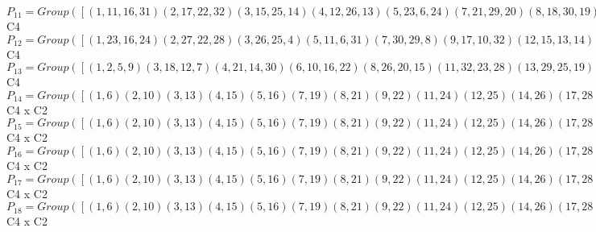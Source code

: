 \documentclass[varwidth=\maxdimen,border=10]{standalone}
\begin{document}
\begin{tabular}
$P_{11} = Group( [ ( 1,11,16,31)( 2,17,22,32)( 3,15,25,14)( 4,12,26,13)( 5,23, 6,24)( 7,21,29,20)( 8,18,30,19)( 9,27,10,28), ( 1,16)( 2,22)( 3,25)( 4,26)( 5, 6)( 7,29)( 8,30)( 9,10)(11,31)(12,13)(14,15)(17,32)(18,19)(20,21)(23,24)(27,28) ] )\cong$ C4\ \\
$P_{12} = Group( [ ( 1,23,16,24)( 2,27,22,28)( 3,26,25, 4)( 5,11, 6,31)( 7,30,29, 8)( 9,17,10,32)(12,15,13,14)(18,21,19,20), ( 1,16)( 2,22)( 3,25)( 4,26)( 5, 6)( 7,29)( 8,30)( 9,10)(11,31)(12,13)(14,15)(17,32)(18,19)(20,21)(23,24)(27,28) ] )\cong$ C4\ \\
$P_{13} = Group( [ ( 1, 2, 5, 9)( 3,18,12, 7)( 4,21,14,30)( 6,10,16,22)( 8,26,20,15)(11,32,23,28)(13,29,25,19)(17,24,27,31), ( 1, 5)( 2, 9)( 3,12)( 4,14)( 6,16)( 7,18)( 8,20)(10,22)(11,23)(13,25)(15,26)(17,27)(19,29)(21,30)(24,31)(28,32) ] )\cong$ C4\ \\
$P_{14} = Group( [ ( 1, 6)( 2,10)( 3,13)( 4,15)( 5,16)( 7,19)( 8,21)( 9,22)(11,24)(12,25)(14,26)(17,28)(18,29)(20,30)(23,31)(27,32), ( 1, 5)( 2, 9)( 3,12)( 4,14)( 6,16)( 7,18)( 8,20)(10,22)(11,23)(13,25)(15,26)(17,27)(19,29)(21,30)(24,31)(28,32), ( 1, 2, 5, 9)( 3,18,12, 7)( 4,21,14,30)( 6,10,16,22)( 8,26,20,15)(11,32,23,28)(13,29,25,19)(17,24,27,31) ] )\cong$ C4 x C2\ \\
$P_{15} = Group( [ ( 1, 6)( 2,10)( 3,13)( 4,15)( 5,16)( 7,19)( 8,21)( 9,22)(11,24)(12,25)(14,26)(17,28)(18,29)(20,30)(23,31)(27,32), ( 1, 5)( 2, 9)( 3,12)( 4,14)( 6,16)( 7,18)( 8,20)(10,22)(11,23)(13,25)(15,26)(17,27)(19,29)(21,30)(24,31)(28,32), ( 1,21, 6, 8)( 2,26,10,14)( 3,32,13,27)( 4, 9,15,22)( 5,30,16,20)( 7,24,19,11)(12,28,25,17)(18,31,29,23) ] )\cong$ C4 x C2\ \\
$P_{16} = Group( [ ( 1, 6)( 2,10)( 3,13)( 4,15)( 5,16)( 7,19)( 8,21)( 9,22)(11,24)(12,25)(14,26)(17,28)(18,29)(20,30)(23,31)(27,32), ( 1, 5)( 2, 9)( 3,12)( 4,14)( 6,16)( 7,18)( 8,20)(10,22)(11,23)(13,25)(15,26)(17,27)(19,29)(21,30)(24,31)(28,32), ( 1,11,16,31)( 2,17,22,32)( 3,15,25,14)( 4,12,26,13)( 5,23, 6,24)( 7,21,29,20)( 8,18,30,19)( 9,27,10,28) ] )\cong$ C4 x C2\ \\
$P_{17} = Group( [ ( 1, 6)( 2,10)( 3,13)( 4,15)( 5,16)( 7,19)( 8,21)( 9,22)(11,24)(12,25)(14,26)(17,28)(18,29)(20,30)(23,31)(27,32), ( 1, 5)( 2, 9)( 3,12)( 4,14)( 6,16)( 7,18)( 8,20)(10,22)(11,23)(13,25)(15,26)(17,27)(19,29)(21,30)(24,31)(28,32), ( 1,18, 6,29)( 2, 3,10,13)( 4,32,15,27)( 5, 7,16,19)( 8,24,21,11)( 9,12,22,25)(14,28,26,17)(20,31,30,23) ] )\cong$ C4 x C2\ \\
$P_{18} = Group( [ ( 1, 6)( 2,10)( 3,13)( 4,15)( 5,16)( 7,19)( 8,21)( 9,22)(11,24)(12,25)(14,26)(17,28)(18,29)(20,30)(23,31)(27,32), ( 1, 5)( 2, 9)( 3,12)( 4,14)( 6,16)( 7,18)( 8,20)(10,22)(11,23)(13,25)(15,26)(17,27)(19,29)(21,30)(24,31)(28,32), ( 1, 3, 6,13)( 2, 7,10,19)( 4,11,15,24)( 5,12,16,25)( 8,17,21,28)( 9,18,22,29)(14,23,26,31)(20,27,30,32) ] )\cong$ C4 x C2\ \\

\end{tabular}
\end{document}
